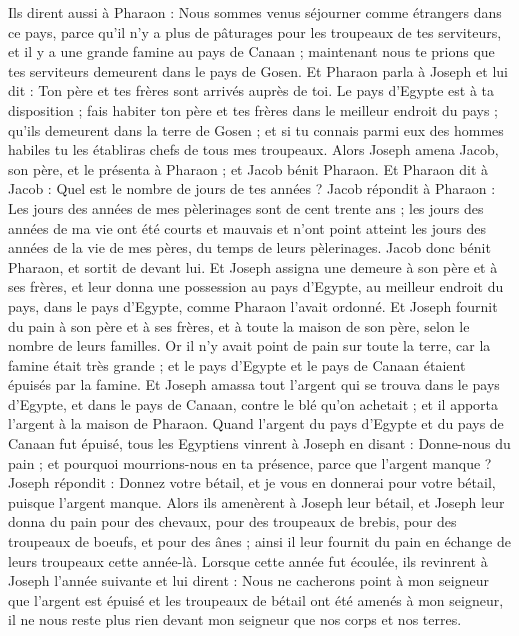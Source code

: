 \begin{multicols}{2}
Ils dirent aussi à Pharaon : Nous sommes venus séjourner comme étrangers dans ce pays, parce qu'il n'y a plus de pâturages pour les troupeaux de tes serviteurs, et il y a une grande famine au pays de Canaan ; maintenant nous te prions que tes serviteurs demeurent dans le pays de Gosen.
Et Pharaon parla à Joseph et lui dit : Ton père et tes frères sont arrivés auprès de toi.
Le pays d'Egypte est à ta disposition ; fais habiter ton père et tes frères dans le meilleur endroit du pays ; qu'ils demeurent dans la terre de Gosen ; et si tu connais parmi eux des hommes habiles tu les établiras chefs de tous mes troupeaux.
Alors Joseph amena Jacob, son père, et le présenta à Pharaon ; et Jacob bénit Pharaon.
Et Pharaon dit à Jacob : Quel est le nombre de jours de tes années ?
Jacob répondit à Pharaon : Les jours des années de mes pèlerinages sont de cent trente ans ; les jours des années de ma vie ont été courts et mauvais et n'ont point atteint les jours des années de la vie de mes pères, du temps de leurs pèlerinages.
Jacob donc bénit Pharaon, et sortit de devant lui.
Et Joseph assigna une demeure à son père et à ses frères, et leur donna une possession au pays d'Egypte, au meilleur endroit du pays, dans le pays d'Egypte, comme Pharaon l'avait ordonné.
Et Joseph fournit du pain à son père et à ses frères, et à toute la maison de son père, selon le nombre de leurs familles.
Or il n'y avait point de pain sur toute la terre, car la famine était très grande ; et le pays d'Egypte et le pays de Canaan étaient épuisés par la famine.
Et Joseph amassa tout l'argent qui se trouva dans le pays d'Egypte, et dans le pays de Canaan, contre le blé qu'on achetait ; et il apporta l'argent à la maison de Pharaon.
Quand l'argent du pays d'Egypte et du pays de Canaan fut épuisé, tous les Egyptiens vinrent à Joseph en disant : Donne-nous du pain ; et pourquoi mourrions-nous en ta présence, parce que l'argent manque ?
Joseph répondit : Donnez votre bétail, et je vous en donnerai pour votre bétail, puisque l'argent manque.
Alors ils amenèrent à Joseph leur bétail, et Joseph leur donna du pain pour des chevaux, pour des troupeaux de brebis, pour des troupeaux de boeufs, et pour des ânes ; ainsi il leur fournit du pain en échange de leurs troupeaux cette année-là.
Lorsque cette année fut écoulée, ils revinrent à Joseph l'année suivante et lui dirent : Nous ne cacherons point à mon seigneur que l'argent est épuisé et les troupeaux de bétail ont été amenés à mon seigneur, il ne nous reste plus rien devant mon seigneur que nos corps et nos terres.

\end{multicols}
